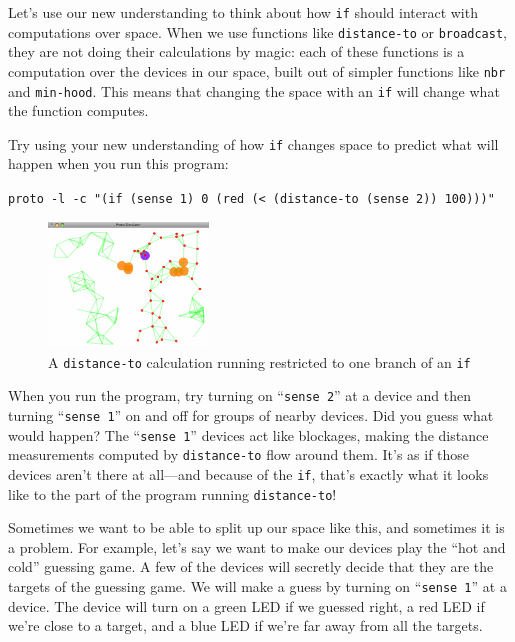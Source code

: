 \documentclass{article}
\newcommand\code[1]{\begin{center}\var{#1}\end{center}}
\newcommand\var[1]{{\tt #1}}
\newcommand\qvar[1]{``{\tt #1}''}
\begin{document}
Let's use our new understanding to think about how \var{if} should
interact with computations over space.  When we use functions like
\var{distance-to} or \var{broadcast}, they are not doing their
calculations by magic: each of these functions is a computation over
the devices in our space, built out of simpler functions like
\var{nbr} and \var{min-hood}.  This means that changing the space with
an \var{if} will change what the function computes.

Try using your new understanding of how \var{if} changes space
to predict what will happen when you run this program:

\code{proto -l -c "(if (sense 1) 0 (red (< (distance-to (sense 2)) 100)))"}

\begin{figure}
  \vspace{-0.8cm}
  \includegraphics[width=0.38\textwidth]{figures/blocked-distance.png}
  \caption{A \var{distance-to} calculation running restricted to one
    branch of an \var{if}}
  \vspace{-0.5cm}
  \label{f:blockdist}
\end{figure}

When you run the program, try turning on \qvar{sense 2} at a device
and then turning \qvar{sense 1} on and off for groups of nearby
devices.  Did you guess what would happen?  The \qvar{sense 1} devices
act like blockages, making the distance measurements computed by
\var{distance-to} flow around them.  It's as if those devices aren't
there at all---and because of the \var{if}, that's exactly what
it looks like to the part of the program running \var{distance-to}!

Sometimes we want to be able to split up our space like this, and
sometimes it is a problem.  For example, let's say we want to make our
devices play the ``hot and cold'' guessing game.  A few of the devices
will secretly decide that they are the targets of the guessing game.
We will make a guess by turning on \qvar{sense 1} at a device.  The
device will turn on a green LED if we guessed right, a red LED if
we're close to a target, and a blue LED if we're far away from all the
targets.
\end{document}
